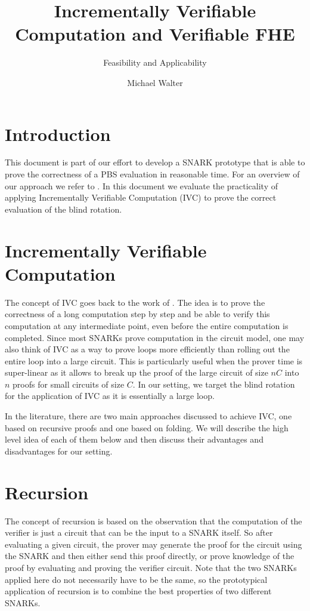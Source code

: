 \documentclass{zamarep}
\title{Incrementally Verifiable Computation and Verifiable FHE}
\subtitle{Feasibility and Applicability}
\author[MW]{Michael Walter}
\begin{document}
\maketitle


\section{Introduction}\label{sec:introduction}
This document is part of our effort to develop a SNARK prototype that is able to prove the correctness of a PBS evaluation in reasonable time. For an overview of our approach we refer to \cite{part1,part2}. In this document we evaluate the practicality of applying Incrementally Verifiable Computation (IVC) to prove the correct evaluation of the blind rotation.

\section{Incrementally Verifiable Computation}
\label{sec:ivc}

The concept of IVC goes back to the work of \cite{TCC:Valiant08}. The idea is to prove the correctness of a long computation step by step and be able to verify this computation at any intermediate point, even before the entire computation is completed. Since most SNARKs prove computation in the circuit model, one may also think of IVC as a way to prove loops more efficiently than rolling out the entire loop into a large circuit. This is particularly useful when the prover time is super-linear as it allows to break up the proof of the large circuit of size $nC$ into $n$ proofs for small circuits of size $C$. In our setting, we target the blind rotation for the application of IVC as it is essentially a large loop. 

In the literature, there are two main approaches discussed to achieve IVC, one based on recursive proofs and one based on folding. We will describe the high level idea of each of them below and then discuss their advantages and disadvantages for our setting.

\section{Recursion}
\label{sec:recurse}

The concept of recursion is based on the observation that the computation of the verifier is just a circuit that can be the input to a SNARK itself. So after evaluating a given circuit, the prover may generate the proof for the circuit using the SNARK and then either send this proof directly, or prove knowledge of the proof by evaluating and proving the verifier circuit. Note that the two SNARKs applied here do not necessarily have to be the same, so the prototypical application of recursion is to combine the best properties of two different SNARKs.
\end{document}
